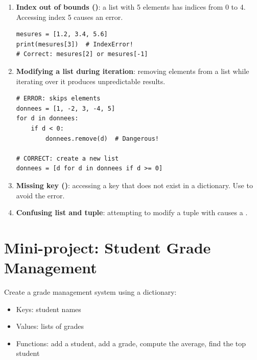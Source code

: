 \begin{errmark}
\begin{enumerate}
    \item \textbf{Index out of bounds ()}: a list with 5 elements has
    indices from 0 to 4. Accessing index 5 causes an error.
    \begin{verbatim}
mesures = [1.2, 3.4, 5.6]
print(mesures[3])  # IndexError!
# Correct: mesures[2] or mesures[-1]
    \end{verbatim}

    \item \textbf{Modifying a list during iteration}: removing elements
    from a list while iterating over it produces unpredictable results.
    \begin{verbatim}
# ERROR: skips elements
donnees = [1, -2, 3, -4, 5]
for d in donnees:
    if d < 0:
        donnees.remove(d)  # Dangerous!

# CORRECT: create a new list
donnees = [d for d in donnees if d >= 0]
    \end{verbatim}

    \item \textbf{Missing key ()}: accessing a key that does not exist in a
    dictionary. Use  to avoid the error.

    \item \textbf{Confusing list and tuple}: attempting to modify a tuple with
     causes a .
\end{enumerate}
\end{errmark}

\section{Mini-project: Student Grade Management}

\begin{projet}
Create a grade management system using a dictionary:
\begin{itemize}
    \item Keys: student names
    \item Values: lists of grades
    \item Functions: add a student, add a grade, compute the average,
          find the top student
\end{itemize}
\end{projet}

